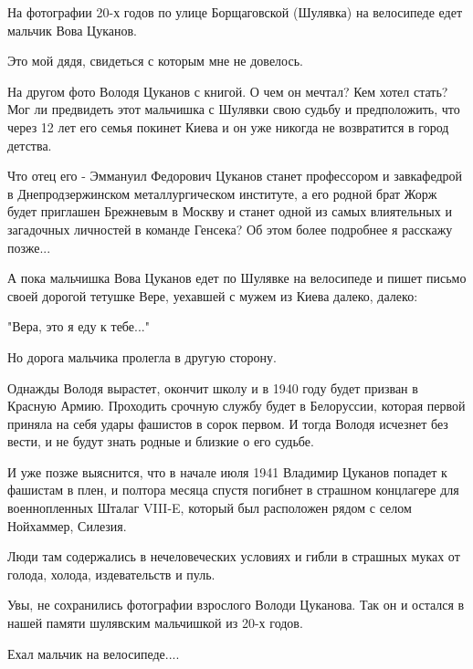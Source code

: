 \raggedcolumns
\begin{multicols}{3} %
\setlength{\parindent}{0pt}


На фотографии 20-х годов по улице Борщаговской (Шулявка) на велосипеде едет
мальчик Вова Цуканов. 

Это мой дядя, свидеться с которым мне не довелось.

На другом фото Володя Цуканов с книгой. О чем он мечтал? Кем хотел стать? Мог
ли предвидеть этот мальчишка с Шулявки свою судьбу и предположить, что через 12
лет его семья покинет Киева и он уже никогда не возвратится в город детства.


Что отец его - Эммануил Федорович Цуканов станет профессором и завкафедрой в
Днепродзержинском металлургическом институте, а его родной брат Жорж будет
приглашен Брежневым в Москву и станет одной из самых влиятельных и загадочных
личностей в команде Генсека? Об этом более подробнее я расскажу позже...


А пока мальчишка Вова Цуканов едет по Шулявке на велосипеде и пишет письмо
своей дорогой тетушке Вере, уехавшей с мужем из Киева далеко, далеко:

"Вера, это я еду к тебе..."

Но дорога мальчика пролегла в другую сторону.

Однажды Володя вырастет, окончит школу и в 1940 году будет призван в Красную
Армию. Проходить срочную службу будет в Белоруссии, которая первой приняла на
себя удары фашистов в сорок первом. И тогда Володя исчезнет без вести, и не
будут знать родные и близкие о его судьбе.


И уже позже выяснится, что в начале июля 1941 Владимир Цуканов попадет к
фашистам в плен, и полтора месяца спустя погибнет в страшном концлагере для
военнопленных Шталаг VIII-E, который был расположен рядом с селом Нойхаммер,
Силезия. 

Люди там содержались в нечеловеческих условиях и гибли в страшных муках от
голода, холода, издевательств и пуль.

Увы, не сохранились фотографии взрослого Володи Цуканова. Так он и остался в
нашей памяти шулявским мальчишкой из 20-х годов.

Ехал мальчик на велосипеде....

\end{multicols} %

